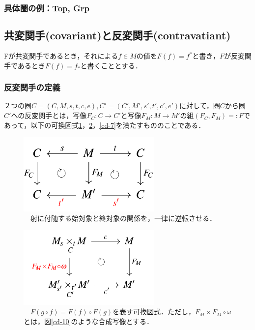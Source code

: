 \documentclass[uplatex, 12pt, a4paper, dvipdfmx]{jsarticle}
\begin{document}
\subsubsection{具体圏の例：\textbf{Top, Grp}}

\subsection{共変関手(covariant)と反変関手(contravatiant)}
Fが共変関手であるとき，それによる$f\in M$の値を$F(f)=f^*$と書き，$F$が反変関手であるとき$F(f)=f_*$と書くこととする．

\subsubsection{反変関手の定義}

\begin{shadebox}\begin{definition}[（反変）関手]
    ２つの圏$C=(C,M,s,t,c,e),C'=(C',M',s',t',c',e')$に対して，圏$C$から圏$C'$への反変関手とは，写像$F_C:C\longrightarrow C'$と写像$F_M:M\longrightarrow M'$の組$(F_C,F_M)=:F$であって，以下の可換図式\ref{cd-8}，\ref{cd-9}，\ref{cd-7}を満たすもののことである．
\end{definition}\end{shadebox}

\begin{figure}[ht]\begin{center} \caption{\label{cd-8}　射に付随する始対象と終対象の関係を，一律に逆転させる．}
    \includegraphics[width=7cm]{cd-8.png}
\end{center}\end{figure}

\begin{figure}[ht]\begin{center} \caption{\label{cd-9}　$F(g\circ f)=F(f)\circ F(g)$を表す可換図式．ただし，$F_M\times F_M\circ\omega$とは，図\ref{cd-10}のような合成写像とする．}
    \includegraphics[width=7cm]{cd-9.png}
\end{center}\end{figure}
\end{document}
